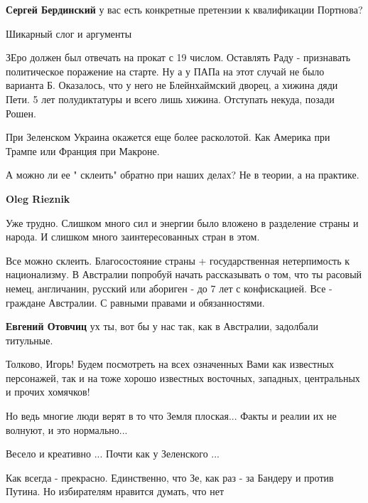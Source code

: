 \begin{itemize}
\begin{itemize} %
\textbf{Сергей Бердинский} у вас есть конкретные претензии к квалификации Портнова?
\end{itemize} %

Шикарный слог и аргументы


ЗЕро должен был отвечать на прокат с 19 числом. Оставлять Раду - признавать
политическое поражение на старте. Ну а у ПАПа на этот случай не было варианта
Б. Оказалось, что у него не Блейнхаймский дворец, а хижина дяди Пети. 5 лет
полудиктатуры и всего лишь хижина. Отступать некуда, позади Рошен.


При Зеленском Украина окажется еще более расколотой. Как Америка при Трампе или Франция при Макроне.

\begin{itemize} %
А можно ли ее " склеить" обратно при наших делах? Не в теории, а на практике.

\textbf{Oleg Rieznik} 

Уже трудно. Слишком много сил и энергии было вложено в разделение страны и
народа. И слишком много заинтересованных стран в этом.


Все можно склеить. Благосостояние страны + государственная нетерпимость к
национализму. В Австралии попробуй начать рассказывать о том, что ты расовый
немец, англичанин, русский или абориген - до 7 лет с конфискацией. Все -
граждане Австралии. С равными правами и обязанностями.

\textbf{Евгений Отовчиц} ух ты, вот бы у нас так, как в Австралии, задолбали титульные.
\end{itemize} %


Толково, Игорь! Будем посмотреть на всех означенных Вами как известных
персонажей, так и на тоже хорошо известных восточных, западных, центральных и
прочих хомячков!

Но ведь многие люди верят в то что Земля плоская... Факты и реалии их не волнуют, и это нормально...

Весело и креативно ... Почти как у Зеленского ...

Как всегда - прекрасно. Единственно, что Зе, как раз - за Бандеру и против Путина. Но избирателям нравится думать, что нет


\end{itemize}
